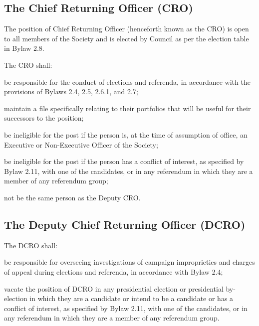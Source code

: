 \subsection {The Chief Returning Officer (CRO)}
\begin{longenum}[ label*=\thesubsection.\arabic*., align=left]
	\item The position of Chief Returning Officer (henceforth known as the CRO) is open to all members of the Society and is elected by Council as per the election table in Bylaw 2.8.
    \item The CRO shall: 
    \begin{longenum}[ label*=\arabic*., align=left]
		\item  be responsible for the conduct of elections and referenda, in accordance with the provisions of Bylaws 2.4, 2.5, 2.6.1, and 2.7; 
		\item maintain a file specifically relating to their portfolios that will be useful for their successors to the position; 
        \item be ineligible for the post if the person is, at the time of assumption of office, an Executive or Non-Executive Officer of the Society; 
        \item be ineligible for the post if the person has a conflict of interest, as specified by Bylaw 2.11, with one of the candidates, or in any referendum in which they are a member of any referendum group;
        \item not be the same person as the Deputy CRO.
        \end{longenum}
\end{longenum}

\subsection {The Deputy Chief Returning Officer (DCRO)} 
\begin{longenum}[ label*=\thesubsection.\arabic*., align=left]
	\item The DCRO shall: 
    \begin{longenum}[ label*=\arabic*., align=left]
		\item be responsible for overseeing investigations of campaign improprieties and charges of appeal during elections and referenda, in accordance with Bylaw 2.4;
        \item vacate the position of DCRO in any presidential election or presidential by-election in which they are a candidate or intend to be a candidate or has a conflict of interest, as specified by Bylaw 2.11, with one of the candidates, or in any referendum in which they are a member of any referendum group.
	\end{longenum}    
\end{longenum}


